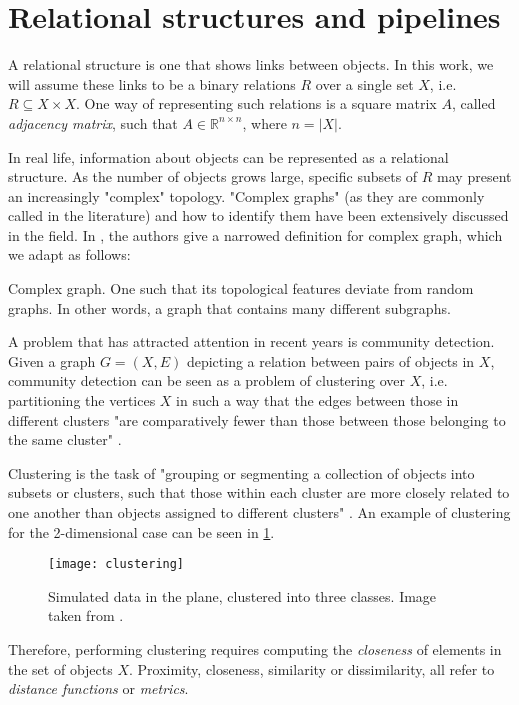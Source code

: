 \documentclass[../main.tex]{subfiles} \label{chapter_soa}
\begin{document}
\section{Relational structures and pipelines}\label{general_pipeline}
A relational structure is one that shows links between objects. In this work, we will assume these links to be a binary relations $R$ over a single set $X$, i.e. $R \subseteq X \times X$. One way of representing such relations is a square matrix $A$, called \emph{adjacency matrix}, such that $A \in \mathbb{R}^{n \times n}$, where $n =\left\vert{X}\right\vert$.
\par In real life, information about objects can be represented as a relational structure. As the number of objects grows large, specific subsets of $R$ may present an increasingly "complex" topology. "Complex graphs" (as they are commonly called in the literature) and how to identify them have been extensively discussed in the field. In \cite{Kim2008}, the authors give a narrowed definition for complex graph, which we adapt as follows:
\theoremstyle{definition}
\begin{definition}{Complex graph}. One such that its topological features deviate from random graphs. In other words, a graph that contains many different subgraphs.
\end{definition}
\par A problem that has attracted attention in recent years is community detection. Given a graph $G = (X, E)$ depicting a relation between pairs of objects in $X$, community detection can be seen as a problem of clustering over $X$, i.e. partitioning the vertices $X$ in such a way that the edges between those in different clusters "are comparatively fewer than those between those belonging to the same cluster" \cite{Fortunato2010}. 
\par Clustering is the task of "grouping or segmenting a collection of objects into subsets or clusters, such that those within each cluster are more closely related to one another than objects assigned to different clusters" \cite{hastie2008}. An example of clustering for the 2-dimensional case can be seen in \ref{clustering}.
\begin{figure}[ht]
\centering
\texttt{[image: clustering]}
\caption{Simulated data in the plane, clustered into three classes. Image taken from \cite{hastie2008}.}
\label{clustering}
\end{figure}
\par Therefore, performing clustering requires computing the \emph{closeness} of elements in the set of objects $X$. Proximity, closeness, similarity or dissimilarity, all refer to \emph{distance functions} or \emph{metrics}. 
\end{document}
